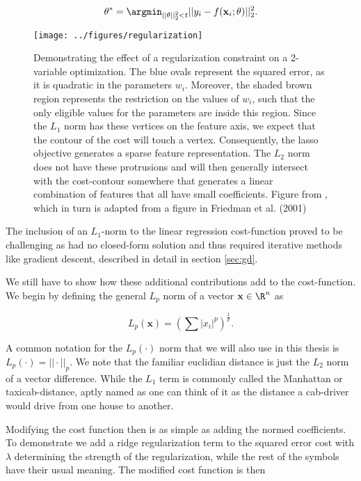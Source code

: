\begin{align}
\theta^* = \argmin_{||\theta||_2^2<t} ||y_i - f(\mathbf{x}_i; \theta)||_2^2.
\end{align}

\begin{figure}
\centering
\texttt{[image: ../figures/regularization]}
\caption[Geometric interpretation of the $L_1$ and $L_2$ regularization and the squared error cost]{Demonstrating the effect of a regularization constraint on a 2-variable optimization. The blue ovals represent the squared error, as it is quadratic in the parameters $w_i$. Moreover, the shaded brown region represents the restriction on the values of $w_i$, such that the only eligible values for the parameters are inside this region. Since the $L_1$ norm has these vertices on the feature axis, we expect that the contour of the cost will touch a vertex. Consequently, the lasso objective generates a sparse feature representation. The $L_2$ norm does not have these protrusions and will then generally intersect with the cost-contour somewhere that generates a linear combination of features that all have small coefficients. Figure from \citet{Mehta2019}, which in turn is adapted from a figure in Friedman et al. (2001)}\label{fig:regularization}
\end{figure}

The inclusion of an $L_1$-norm to the linear regression cost-function proved to be challenging as had no closed-form solution and thus required iterative methods like gradient descent, described in detail in section \ref{sec:gd}. 

We still have to show how these additional contributions add to the cost-function. We begin by defining the general $L_p$ norm of a vector $\mathbf{x} \in \R^n$ as

\begin{equation}
L_p(\mathbf{x}) = \left(\sum |x_i|^p\right)^{\frac{1}{p}}.
\end{equation}

\noindent A common notation for the $L_p(\cdot)$ norm that we will also use in this thesis is $L_p(\cdot) = ||\cdot||_p$. We note that the familiar euclidian distance is just the $L_2$ norm of a vector difference. While the $L_1$ term is commonly called the Manhattan or taxicab-distance, aptly named as one can think of it as the distance a cab-driver would drive from one house to another.

Modifying the cost function then is as simple as adding the normed coefficients. To demonstrate we add a ridge regularization term to the squared error cost with $\lambda$ determining the strength of the regularization, while the rest of the symbols have their usual meaning. The modified cost function is then

